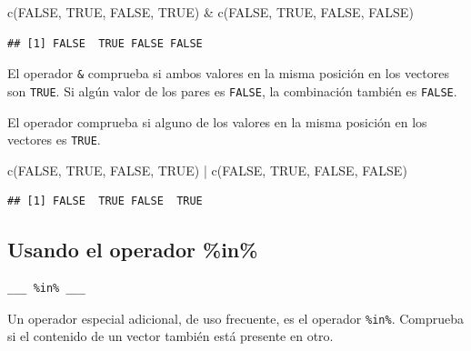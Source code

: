 \documentclass[
]{book}
\newenvironment{Shaded}{\begin{snugshade}}{\end{snugshade}}
\newcommand{\ConstantTok}[1]{\textcolor[rgb]{0.00,0.00,0.00}{#1}}
\newcommand{\FunctionTok}[1]{\textcolor[rgb]{0.00,0.00,0.00}{#1}}
\newcommand{\NormalTok}[1]{#1}
\newcommand{\SpecialCharTok}[1]{\textcolor[rgb]{0.00,0.00,0.00}{#1}}
\begin{document}
\begin{Shaded}
\begin{Highlighting}[]
\FunctionTok{c}\NormalTok{(}\ConstantTok{FALSE}\NormalTok{, }\ConstantTok{TRUE}\NormalTok{, }\ConstantTok{FALSE}\NormalTok{, }\ConstantTok{TRUE}\NormalTok{) }\SpecialCharTok{\&} \FunctionTok{c}\NormalTok{(}\ConstantTok{FALSE}\NormalTok{, }\ConstantTok{TRUE}\NormalTok{, }\ConstantTok{FALSE}\NormalTok{, }\ConstantTok{FALSE}\NormalTok{)}
\end{Highlighting}
\end{Shaded}

\begin{verbatim}
## [1] FALSE  TRUE FALSE FALSE
\end{verbatim}

El operador \texttt{\&} comprueba si ambos valores en la misma posición en los vectores son \texttt{TRUE}. Si algún valor de los pares es \texttt{FALSE}, la combinación también es \texttt{FALSE}.

El operador \texttt{\textbar{}} comprueba si alguno de los valores en la misma posición en los vectores es \texttt{TRUE}.

\begin{Shaded}
\begin{Highlighting}[]
\FunctionTok{c}\NormalTok{(}\ConstantTok{FALSE}\NormalTok{, }\ConstantTok{TRUE}\NormalTok{, }\ConstantTok{FALSE}\NormalTok{, }\ConstantTok{TRUE}\NormalTok{) }\SpecialCharTok{|} \FunctionTok{c}\NormalTok{(}\ConstantTok{FALSE}\NormalTok{, }\ConstantTok{TRUE}\NormalTok{, }\ConstantTok{FALSE}\NormalTok{, }\ConstantTok{FALSE}\NormalTok{)}
\end{Highlighting}
\end{Shaded}

\begin{verbatim}
## [1] FALSE  TRUE FALSE  TRUE
\end{verbatim}

\hypertarget{usando-el-operador-in}{%
\subsection{Usando el operador \%in\%}\label{usando-el-operador-in}}

\begin{verbatim}
___ %in% ___
\end{verbatim}

Un operador especial adicional, de uso frecuente, es el operador \texttt{\%in\%}. Comprueba si el contenido de un vector también está presente en otro.
\end{document}
